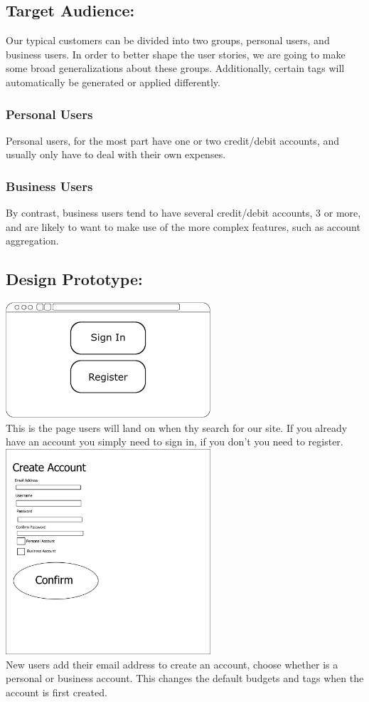 \documentclass[12pt]{article}
\begin{document}
\subsection{Target Audience:}
Our typical customers can be divided into two groups, personal users, and business users. In order to better shape the user stories, we are going to make some broad generalizations about these groups. Additionally, certain tags will automatically be generated or applied differently.\\
\subsubsection{Personal Users}
Personal users, for the most part have one or two credit/debit accounts, and usually only have to deal with their own expenses.\\
\subsubsection{Business Users}
By contrast, business users tend to have several credit/debit accounts, 3 or more, and are likely to want to make use of the more complex features, such as account aggregation.\\
\subsection{Design Prototype:}
\includegraphics[width=3in]{HomePage.png}\\
This is the page users will land on when thy search for our site. If you already have an account you simply need to sign in, if you don't you need to register.\\

\includegraphics[width=3in]{create_account.jpg}\\
New users add their email address to create an account, choose whether is a personal or business account. This changes the default budgets and tags when the account is first created.\\
\end{document}
